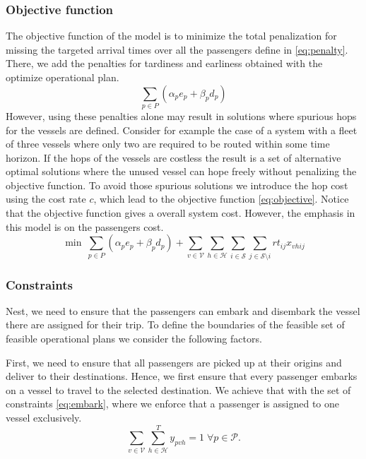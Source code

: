 \documentclass[12pt]{elsarticle}
\begin{document}
\subsubsection{Objective function}

The objective function of the model is to minimize the total penalization for
missing the targeted arrival times over all the passengers define in
\eqref{eq:penalty}. There, we add the penalties for tardiness and earliness
obtained with the optimize operational plan.
\begin{equation}
  \sum_{p \in P} (\alpha_p e_p + \beta_p d_p) \label{eq:penalty}
\end{equation}
However, using these penalties alone may result in solutions where spurious
hops for the vessels are defined. Consider for example the case of a system
with a fleet of three vessels where only two are required to be routed within
some time horizon. If the hops of the vessels are costless the result is a
set of alternative optimal solutions where the unused vessel can hope freely
without penalizing the objective function. To avoid those spurious solutions
we introduce the hop cost using the cost rate $c$, which lead to the
objective function \eqref{eq:objective}. Notice that the objective function
gives a overall system cost. However, the emphasis in this model is on the
passengers cost.
\begin{equation}
  \min \ \sum_{p \in P} (\alpha_p e_p + \beta_p d_p) +
  \sum_{v \in \mathcal{V}} \sum_{h \in \mathcal{H}} \sum_{i \in \mathcal{S}} \sum_{j \in \mathcal{S}\setminus i} rt_{ij}x_{vhij}\label{eq:objective}
\end{equation}

\subsubsection{Constraints}

Nest, we need to ensure that the passengers can embark and disembark the
vessel there are assigned for their trip. To define the boundaries of the
feasible set of feasible operational plans we consider the following factors.

First, we need to ensure that all passengers are picked up at their origins
and deliver to their destinations. Hence, we first ensure that every
passenger embarks on a vessel to travel to the selected destination. We
achieve that with the set of constraints \eqref{eq:embark}, where we enforce
that a passenger is assigned to one vessel exclusively.
\begin{equation}
  \label{eq:embark}
  \sum_{v \in \mathcal{V}}  \sum_{h \in \mathcal{H}}^{T} y_{pvh} = 1 \;\forall p \in \mathcal{P}.
\end{equation}
\end{document}
